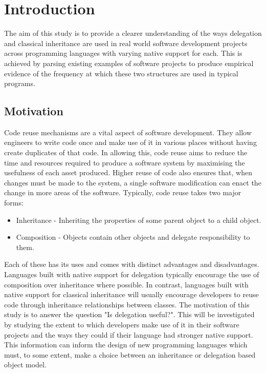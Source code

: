 \chapter{Introduction}\label{C:intro}
The aim of this study is to provide a clearer understanding of the ways delegation and classical inheritance are used in real world software development projects across programming languages with varying native support for each. This is achieved by parsing existing examples of software projects to produce empirical evidence of the frequency at which these two structures are used in typical programs.

\section{Motivation}
Code reuse mechanisms are a vital aspect of software development. They allow engineers to write code once and make use of it in various places without having create duplicates of that code. In allowing this, code reuse aims to reduce the time and resources required to produce a software system by maximising the usefulness of each asset produced. Higher reuse of code also ensures that, when changes must be made to the system, a single software modification can enact the change in more areas of the software.
\newline
Typically, code reuse takes two major forms:
\begin{itemize}
	\item Inheritance - Inheriting the properties of some parent object to a child object.
	\item Composition - Objects contain other objects and delegate responsibility to them.
\end{itemize}
Each of these has its uses and comes with distinct advantages and disadvantages. Languages built with native support for delegation typically encourage the use of composition over inheritance where possible. In contrast, languages built with native support for classical inheritance will usually encourage developers to reuse code through inheritance relationships between classes.
\newline
The motivation of this study is to answer the question "Is delegation useful?". This will be investigated by studying the extent to which developers make use of it in their software projects and the ways they could if their language had stronger native support. This information can inform the design of new programming languages which must, to some extent, make a choice between an inheritance or delegation based object model.

